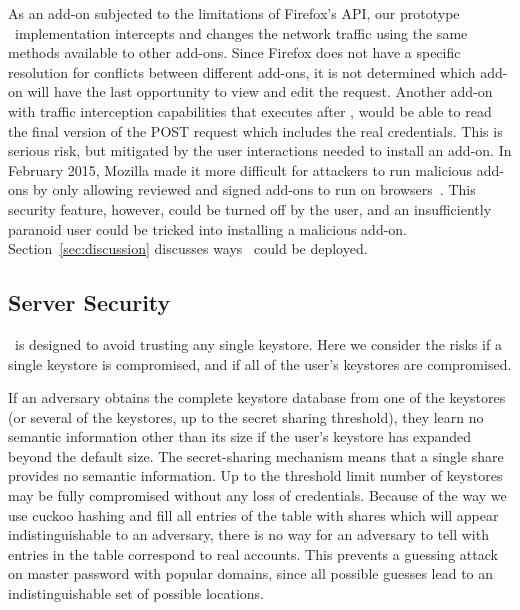 As an add-on subjected to the limitations of Firefox's API, our prototype \SecPass\ implementation intercepts and changes the network traffic using the same methods available to other add-ons. Since Firefox does not have a
specific resolution for conflicts between different add-ons, it is not determined which add-on will have the last opportunity to view and edit the request.  Another add-on with traffic interception capabilities that  executes after \SecPass, would be able to read the final version of the POST request which includes the real credentials.  This is serious risk, but mitigated by the user interactions needed to install an add-on. In February 2015, Mozilla made it more difficult for attackers to run malicious add-ons by only allowing reviewed and signed add-ons to run on browsers~\cite{mozilla_review_policies}. This security feature, however, could be turned off by the user, and an insufficiently paranoid user could be tricked into installing a malicious add-on. Section~\ref{sec:discussion} discusses ways \SecPass\ could be deployed.

\subsection{Server Security} \label{server_analysis}
\SecPass\ is designed to avoid trusting any single keystore. Here we consider the risks if a single keystore is compromised, and if all of the user's keystores are compromised.

If an adversary obtains the complete keystore database from one of the keystores (or several of the keystores, up to the secret sharing threshold), they learn no semantic information other than its size if the user's keystore has expanded beyond the default size. The secret-sharing mechanism means that a single share provides no semantic information. Up to the threshold limit number of keystores may be fully compromised without any loss of credentials.
Because of the way we use cuckoo hashing and fill all entries of the table with shares which will appear indistinguishable to an adversary, there is no way for an adversary to tell with entries in the table correspond to real accounts. This prevents a guessing attack on master password with popular domains, since all possible guesses lead to an indistinguishable set of possible locations. 


